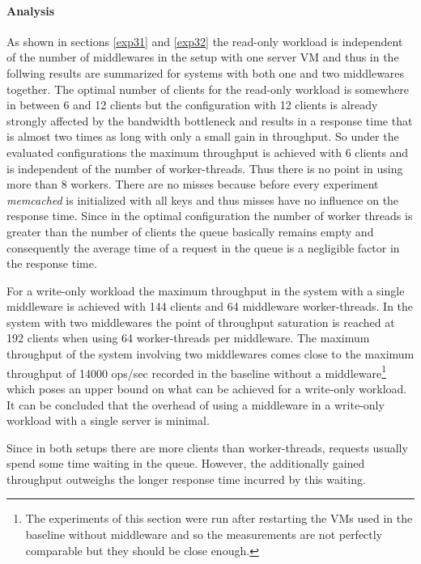 \documentclass[report.tex]{subfiles}
\begin{document}

\paragraph{Analysis}

As shown in sections \ref{exp31} and \ref{exp32} the read-only workload is independent of the number of middlewares in the setup with one server VM and thus in the follwing results are summarized for systems with both one and two middlewares together.
The optimal number of clients for the read-only workload is somewhere in between 6 and 12 clients but the configuration with 12 clients is already strongly affected by the bandwidth bottleneck and results in a response time that is almost two times as long with only a small gain in throughput. So under the evaluated configurations the maximum throughput is achieved with 6 clients and is independent of the number of worker-threads. Thus there is no point in using more than 8 workers. 
There are no misses because before every experiment \emph{memcached} is initialized with all keys and thus misses have no influence on the response time. Since in the optimal configuration the number of worker threads is greater than the number of clients the queue basically remains empty and consequently the average time of a request in the queue is a negligible factor in the response time.

For a write-only workload the maximum throughput  in the system with a single middleware is achieved with 144 clients and 64 middleware worker-threads. In the system with two middlewares the point of throughput saturation is reached at 192 clients when using 64 worker-threads per middleware. The maximum throughput of the system involving two middlewares comes close to the maximum throughput of 14000 ops/sec recorded in the baseline without a middleware\footnote{The experiments of this section were run after restarting the VMs used in the baseline without middleware and so the measurements are not perfectly comparable but they should be close enough.} which poses an upper bound on what can be achieved for a write-only workload. It can be concluded that the overhead of using a middleware in a write-only workload with a single server is minimal.

Since in both setups there are more clients than worker-threads, requests usually spend some time waiting in the queue. However, the additionally gained throughput outweighs the longer response time incurred by this waiting.
\end{document}
